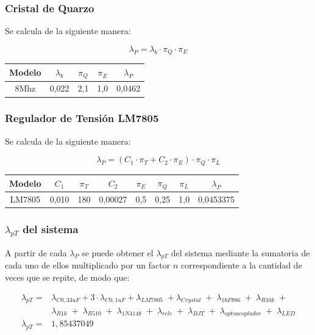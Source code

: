 \documentclass{article}
\begin{document}
\subsubsection{Cristal de Quarzo}
Se calcula de la siguiente manera:

\[\lambda_P = \lambda_b  \cdot \pi_Q  \cdot \pi_E \] 
\begin{center}
\begin{tabular}{ | c | c | c | c | c |}
  \hline
  Modelo & $\lambda_b$ & $\pi_Q$ & $\pi_E$ & $\lambda_P$ \\
  \hline
    8Mhz & 0,022 & 2,1 & 1,0 & 0,0462 \\
  \hline
\end{tabular}
\end{center}

\subsubsection{Regulador de Tensión LM7805}
Se calcula de la siguiente manera:

\[\lambda_P = (C_1  \cdot \pi_T + C_2  \cdot \pi_E)  \cdot \pi_Q  \cdot \pi_L \] 

\begin{center}
\begin{tabular}{ | c | c | c | c | c | c | c | c |}
  \hline
  Modelo & $C_1$ & $\pi_T$ & $C_2$ & $\pi_E$ & $\pi_Q$ & $\pi_L$ & $\lambda_P$ \\
  \hline
    LM7805 & 0,010 & 180 & 0,00027 & 0,5 & 0,25 & 1,0 & 0,0453375 \\
  \hline
\end{tabular}
\end{center}

\subsubsection{$\lambda_{pT}$ del sistema}
A partir de cada $\lambda_P$ se puede obtener el  $\lambda_{pT}$ del sistema mediante la sumatoria de cada uno de ellos multiplicado por un factor $n$ correspondiente a la cantidad de veces que se repite, de modo que:

\begin{align*}
\lambda_{pT} =&\lambda_{C0,33uF} + 3 \cdot \lambda_{C0,1uF} + \lambda_{LM7805} \; + \lambda_{Crystal} \;+\; \lambda_{16F886} \;+\; \lambda_{R10k} \;+\;\\
			  &\lambda_{R1k} \;+\; \lambda_{R510} \;+\; \lambda_{1N4148} \;+\; \lambda_{rele} \;+\; \lambda_{BJT} \;+\; \lambda_{optoacoplador} \;+\; \lambda_{LED} \\
\lambda_{pT} =&1,85437049 
\end{align*}
\end{document}
